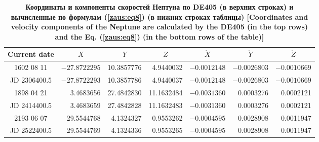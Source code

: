 \begin{table}
\center \small
\begin{minipage}[t]{160mm}
\centering
\caption{\bf Координаты и компоненты скоростей Нептуна  по DE405 (в верхних строках) и вычисленные по формулам  (\ref{zaus:eq8}) (в нижних строках таблицы) [Coordinates and velocity components of the Neptune are calculated by the  DE405 (in the top rows) and the Eq. (\ref{zaus:eq8}) (in the bottom rows of the table)]
\vspace{-3mm}}
\begin{tabular}{|c|r|r|r|r|r|r|}
\hline
\footnotesize
\rule{0mm}{12pt}%
Current date & \multicolumn{1}{c|}{\footnotesize $X$}&	\multicolumn{1}{c|}{\footnotesize $Y$}&	\multicolumn{1}{c|}{\footnotesize $Z$}&	\multicolumn{1}{c|}{\footnotesize $\dot{X}$}&	\multicolumn{1}{c|}{\footnotesize $\dot{Y}$}&	\multicolumn{1}{c|}{\footnotesize$\dot{Z}$}\\ \hline
\rule{0mm}{14pt}%
1602 08 11&	$-27.8722295$&	10.3857776&	4.9440032&	$-0.0012148$&	$-0.0026803$&	 $-0.0010669$\\
JD 2306400.5&	$-27.8722293$&	10.3857786&	4.9440037&	$-0.0012148$&	$-0.0026803$&	 $-0.0010669$\\ \hline
1898 04 21&	3.4683656&	27.4842830&	11.1632484&	$-0.0031360$&	0.0003276&	 0.0002121\\
JD 2414400.5&	3.4683659&	27.4842828&	11.1632483&	$-0.0031360$&	0.0003276&	 0.0002121\\ \hline
2193 06 07&	29.5544768&	4.1324327&	0.9553262&	$-0.0004595$&	0.0028908&	 0.0011947\\
JD 2522400.5&	29.5544769&	4.1324336&	0.9553265&	$-0.0004595$&	0.0028908&	 0.0011947\\ \hline
\end{tabular}
\label{table:zausaev:tabl12}

\vspace{5mm}


\end{minipage}
\end{table}
